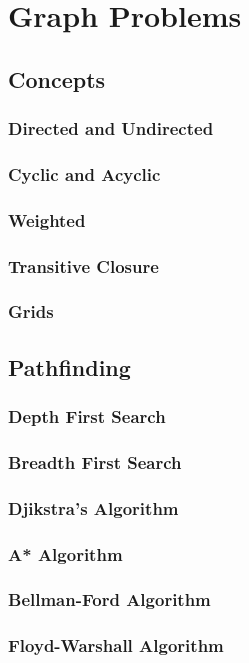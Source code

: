 \section{Graph Problems}
\subsection{Concepts}
\subsubsection{Directed and Undirected}
\subsubsection{Cyclic and Acyclic}
\subsubsection{Weighted}
\subsubsection{Transitive Closure}
\subsubsection{Grids}
\subsection{Pathfinding}
\subsubsection{Depth First Search}
\subsubsection{Breadth First Search}
\subsubsection{Djikstra's Algorithm}
\subsubsection{A* Algorithm}
\subsubsection{Bellman-Ford Algorithm}
\subsubsection{Floyd-Warshall Algorithm}
